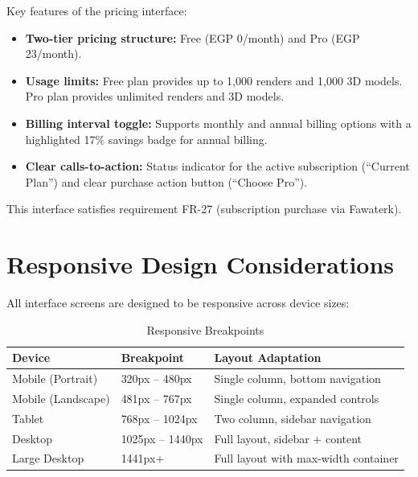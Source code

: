 Key features of the pricing interface:
\begin{itemize}
    \item \textbf{Two-tier pricing structure:} Free (EGP 0/month) and Pro (EGP 23/month).
    \item \textbf{Usage limits:} Free plan provides up to 1,000 renders and 1,000 3D models. Pro plan provides unlimited renders and 3D models.
    \item \textbf{Billing interval toggle:} Supports monthly and annual billing options with a highlighted 17\% savings badge for annual billing.
    \item \textbf{Clear calls-to-action:} Status indicator for the active subscription (``Current Plan'') and clear purchase action button (``Choose Pro'').
\end{itemize}

This interface satisfies requirement FR-27 (subscription purchase via Fawaterk).

\section{Responsive Design Considerations}
\label{sec:app_ui_responsive}

All interface screens are designed to be responsive across device sizes:

\begin{table}[htbp]
    \centering
    \caption{Responsive Breakpoints}
    \label{tab:app_breakpoints}
    \begin{tabular}{|l|l|l|}
        \hline
        \textbf{Device} & \textbf{Breakpoint} & \textbf{Layout Adaptation} \\
        \hline
        Mobile (Portrait) & 320px -- 480px & Single column, bottom navigation \\
        \hline
        Mobile (Landscape) & 481px -- 767px & Single column, expanded controls \\
        \hline
        Tablet & 768px -- 1024px & Two column, sidebar navigation \\
        \hline
        Desktop & 1025px -- 1440px & Full layout, sidebar + content \\
        \hline
        Large Desktop & 1441px+ & Full layout with max-width container \\
        \hline
    \end{tabular}
\end{table}

